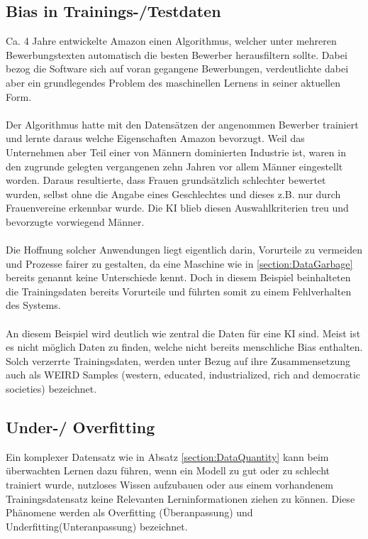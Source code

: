 \documentclass[12pt,oneside,a4paper,parskip]{scrbook}
\begin{document}
\subsection{Bias in Trainings-/Testdaten}
\label{section:biasInTest}
Ca. 4 Jahre entwickelte Amazon einen Algorithmus, welcher unter mehreren Bewerbungstexten automatisch die besten Bewerber herausfiltern sollte. Dabei bezog die Software sich auf voran gegangene Bewerbungen, verdeutlichte dabei aber ein grundlegendes Problem des maschinellen Lernens in seiner aktuellen Form.\\\\
Der Algorithmus hatte mit den Datensätzen der angenommen Bewerber trainiert und lernte daraus welche Eigenschaften Amazon bevorzugt. Weil das Unternehmen aber Teil einer von Männern dominierten Industrie ist, waren in den zugrunde gelegten vergangenen zehn Jahren vor allem Männer eingestellt worden. Daraus resultierte, dass Frauen grundsätzlich schlechter bewertet wurden, selbst ohne die Angabe eines Geschlechtes und dieses z.B. nur durch Frauenvereine erkennbar wurde. Die KI blieb diesen Auswahlkriterien treu und bevorzugte vorwiegend Männer.\cite{amazon}
\\\\
Die Hoffnung solcher Anwendungen liegt eigentlich darin, Vorurteile zu vermeiden und Prozesse fairer zu gestalten, da eine Maschine wie in \ref{section:DataGarbage} bereits genannt keine Unterschiede kennt. Doch in diesem Beispiel beinhalteten die Trainingsdaten bereits Vorurteile und führten somit zu einem Fehlverhalten des Systems.
\\\\
An diesem Beispiel wird deutlich wie zentral die Daten für eine KI sind.
Meist ist es nicht möglich Daten zu finden, welche nicht bereits menschliche Bias enthalten. Solch verzerrte Trainingsdaten, werden unter Bezug auf ihre Zusammensetzung auch als WEIRD Samples (western, educated, industrialized, rich and democratic societies) bezeichnet\cite{BiasInKi}.


\subsection{Under-/ Overfitting}
\label{section:OverUnderfitting}

Ein komplexer Datensatz wie in Absatz \ref{section:DataQuantity} kann beim überwachten Lernen dazu führen, wenn ein Modell zu gut oder zu schlecht trainiert wurde, nutzloses Wissen aufzubauen oder aus einem vorhandenem Trainingsdatensatz keine Relevanten Lerninformationen ziehen zu können. Diese Phänomene werden als Overfitting (Überanpassung) und Underfitting(Unteranpassung) bezeichnet.
\end{document}
